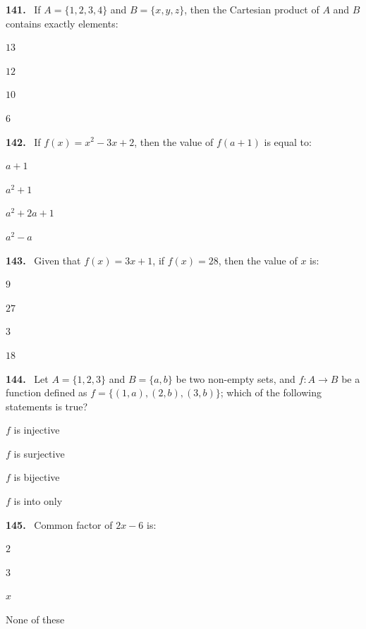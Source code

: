 \documentclass[11pt]{article}
\newenvironment{qenv}[1]{%
  \par\medskip\noindent\textbf{#1.}\ \ignorespaces
}{\par}
\begin{document}
\begin{qenv}{141} If $A=\{1,2,3,4\}$ and $B=\{x,y,z\}$, then the Cartesian product of $A$ and $B$ contains exactly \underline{\hspace{2cm}} elements:
\begin{options} \item $13$ \item $12$ \item $10$ \item $6$ \end{options} \end{qenv}

\begin{qenv}{142} If $f(x)=x^2-3x+2$, then the value of $f(a+1)$ is equal to:
\begin{options} \item $a+1$ \item $a^2+1$ \item $a^2+2a+1$ \item $a^2-a$ \end{options} \end{qenv}

\begin{qenv}{143} Given that $f(x)=3x+1$, if $f(x)=28$, then the value of $x$ is:
\begin{options} \item $9$ \item $27$ \item $3$ \item $18$ \end{options} \end{qenv}

\begin{qenv}{144} Let $A=\{1,2,3\}$ and $B=\{a,b\}$ be two non-empty sets, and $f:A\to B$ be a function defined as $f=\{(1,a),(2,b),(3,b)\}$; which of the following statements is true?
\begin{options} \item $f$ is injective \item $f$ is surjective \item $f$ is bijective \item $f$ is into only \end{options} \end{qenv}

\begin{qenv}{145} Common factor of $2x-6$ is:
\begin{options} \item $2$ \item $3$ \item $x$ \item None of these \end{options} \end{qenv}
\end{document}
